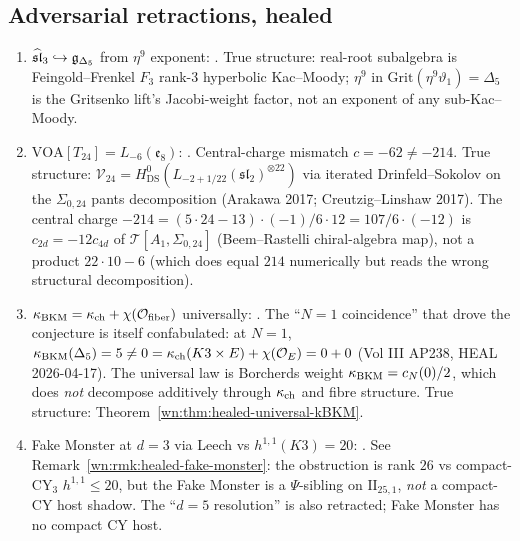 \subsection{Adversarial retractions, healed}
\label{wn:subsec:healed-retractions}

\begin{theorem}
\label{wn:thm:healed-retractions}
\begin{enumerate}
\item $\widehat{\mathfrak{sl}}_3 \hookrightarrow \mathfrak{g}_{\Delta_5}$ from $\eta^9$ exponent: \ClaimStatusRetracted. True structure: real-root subalgebra is Feingold--Frenkel $F_3$ rank-3 hyperbolic Kac--Moody; $\eta^9$ in $\mathrm{Grit}(\eta^9 \vartheta_1) = \Delta_5$ is the Gritsenko lift's Jacobi-weight factor, not an exponent of any sub-Kac--Moody.

\item $\mathrm{VOA}[T_{24}] = L_{-6}(\mathfrak e_8)$: \ClaimStatusRetracted. Central-charge mismatch $c = -62 \neq -214$. True structure: $\mathcal V_{24} = H^0_{\mathrm{DS}}(L_{-2 + 1/22}(\mathfrak{sl}_2)^{\otimes 22})$ via iterated Drinfeld--Sokolov on the $\Sigma_{0, 24}$ pants decomposition (Arakawa 2017; Creutzig--Linshaw 2017). The central charge $-214 = (5 \cdot 24 - 13) \cdot (-1) / 6 \cdot 12 = 107/6 \cdot (-12)$ is $c_{2d} = -12 c_{4d}$ of $\mathcal T[A_1, \Sigma_{0, 24}]$ (Beem--Rastelli chiral-algebra map), not a product $22 \cdot 10 - 6$ (which does equal $214$ numerically but reads the wrong structural decomposition).

\item $\kappa_{\mathrm{BKM}} = \kappa_{\mathrm{ch}} + \chi(\mathcal{O}_{\mathrm{fiber}})$ universally: \ClaimStatusRetracted. The ``$N = 1$ coincidence'' that drove the conjecture is itself confabulated: at $N = 1$, $\kappa_{\mathrm{BKM}}(\Delta_5) = 5 \neq 0 = \kappa_{\mathrm{ch}}(K3 \times E) + \chi(\mathcal{O}_E) = 0 + 0$ (Vol III AP238, HEAL 2026-04-17). The universal law is Borcherds weight $\kappa_{\mathrm{BKM}} = c_N(0)/2$, which does \emph{not} decompose additively through $\kappa_{\mathrm{ch}}$ and fibre structure. True structure: Theorem~\ref{wn:thm:healed-universal-kBKM}.

\item Fake Monster at $d = 3$ via Leech vs $h^{1, 1}(K3) = 20$: \ClaimStatusRetracted. See Remark~\ref{wn:rmk:healed-fake-monster}: the obstruction is rank $26$ vs compact-CY$_3$ $h^{1, 1} \leq 20$, but the Fake Monster is a $\Psi$-sibling on $\mathrm{II}_{25, 1}$, \emph{not} a compact-CY host shadow. The ``$d = 5$ resolution'' is also retracted; Fake Monster has no compact CY host.


\end{enumerate}
\end{theorem}
